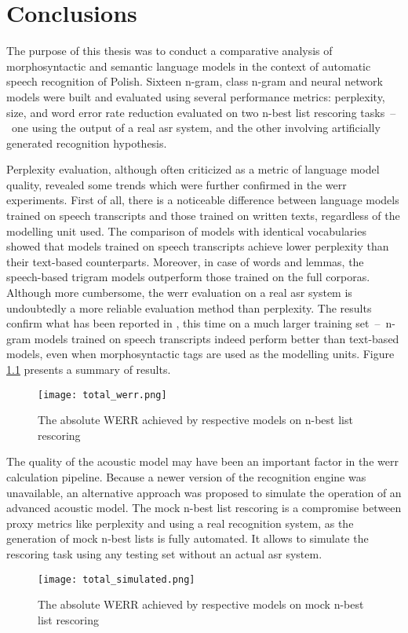 \chapter{Conclusions}
\label{chapter:conclusion}
The purpose of this thesis was to conduct a comparative analysis of morphosyntactic and semantic language models in the context of automatic speech recognition of Polish. Sixteen n-gram, class n-gram and neural network models were built and evaluated using several performance metrics: perplexity, size, and word error rate reduction evaluated on two n-best list rescoring tasks~--~one using the output of a real \gls{asr} system, and the other involving artificially generated recognition hypothesis.

Perplexity evaluation, although often criticized as a metric of language model quality, revealed some trends which were further confirmed in the \gls{werr} experiments. First of all, there is a noticeable difference between language models trained on speech transcripts and those trained on written texts, regardless of the modelling unit used. The comparison of models with identical vocabularies showed that models trained on speech transcripts achieve lower perplexity than their text-based counterparts. Moreover, in case of words and lemmas, the speech-based trigram models outperform those trained on the full corporas.
Although more cumbersome, the \gls{werr} evaluation on a real \gls{asr} system is undoubtedly a more reliable evaluation method than perplexity. The results confirm what has been reported in \cite{dziadzio2015comparison}, this time on a much larger training set~--~n-gram models trained on speech transcripts indeed perform better than text-based models, even when morphosyntactic tags are used as the modelling units. Figure \ref{figure:total} presents a summary of results.

\begin{figure}[!htbp]
	  \centering
	  \texttt{[image: total\_werr.png]}
	  \caption{The absolute WERR achieved by respective models on n-best list rescoring}
	      \label{figure:total}
\end{figure}

The quality of the acoustic model may have been an important factor in the \gls{werr} calculation pipeline. Because a newer version of the recognition engine was unavailable, an alternative approach was proposed to simulate the operation of an advanced acoustic model. The mock n-best list rescoring is a compromise between proxy metrics like perplexity and using a real recognition system, as the generation of mock n-best lists is fully automated. It allows to simulate the rescoring task using any testing set without an actual \gls{asr} system.

\begin{figure}[!htbp]
	  \centering
	  \texttt{[image: total\_simulated.png]}
	  \caption{The absolute WERR achieved by respective models on mock n-best list rescoring}
	      \label{figure:total_mock}
\end{figure}
